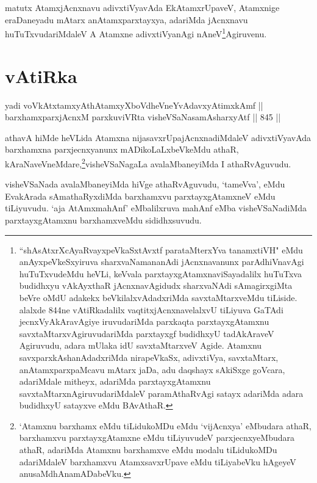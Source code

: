 \begin{artha}
matutx AtamxjAcnxnavu adivxtiVyavAda EkAtamxrUpaveV, Atamxnige eraDaneyadu mAtarx anAtamxparxtayxya, adariMda jAcnxnavu huTuTxvudariMdaleV A Atamxne adivxtiVyanAgi nAneV\footnote{``shAsAtxrXcAyaRvayxpeVkaSxtAvxtf parataMterxYva tanamxtiVH" eMdu anAyxpeVkeSxyiruva sharxvaNamananAdi jAcnxnavanunx parAdhiVnavAgi huTuTxvudeMdu heVLi, keVvala parxtayxgAtamxnaviSayadalilx huTuTxva budidhxyu vAkAyxthaR jAcnxnavAgidudx sharxvaNAdi sAmagirxgiMta beVre oMdU adakekx beVkilalxvAdadxriMda savxtaMtarxveMdu tiLiside. alalxde 844ne vAtiRkadalilx vaqtitxjAcnxnavelalxvU tiLiyuva GaTAdi jecnxVyAkAravAgiye iruvudariMda parxkaqta parxtayxgAtamxnu savxtaMtarxvAgiruvudariMda parxtayxgf budidhxyU tadAkAraveV Agiruvudu, adara mUlaka idU savxtaMtarxveV Agide. Atamxnu savxparxkAshanAdadxriMda nirapeVkaSx, adivxtiVya, savxtaMtarx, anAtamxparxpaMcavu mAtarx jaDa, adu daqshayx sAkiSxge goVcara, adariMdale mitheyx, adariMda parxtayxgAtamxnu savxtaMtarxnAgiruvudariMdaleV paramAthaRvAgi satayx adariMda adara budidhxyU satayxve eMdu BAvAthaR.}Agiruvenu.
\end{artha}

\section*{vAtiRka}


\begin{shl}
yadi voVkAtxtamxyAthAtamxyXboVdheVneYvAdavxyAtimxkAmf || \\
barxhamxparxjAcnxM parxkuviVRta visheVSaNasamAsharxyAtf \hfill || 845 ||  
\end{shl}

\begin{artha}
athavA hiMde heVLida Atamxna nijasavxrUpajAcnxnadiMdaleV adivxtiVyavAda barxhamxna parxjecnxyanunx mADikoLaLxbeVkeMdu athaR, kAraNaveVneMdare,\footnote{`Atamxnu barxhamx eMdu tiLidukoMDu eMdu `vijAcnxya' eMbudara athaR, barxhamxvu parxtayxgAtamxne eMdu tiLiyuvudeV parxjecnxyeMbudara athaR, adariMda Atamxnu barxhamxve eMdu modalu tiLidukoMDu adariMdaleV barxhamxvu AtamxsavxrUpave eMdu tiLiyabeVku hAgeyeV anusaMdhAnamADabeVku.}visheVSaNagaLa avalaMbaneyiMda I athaRvAguvudu.
\end{artha}

\begin{artha}
visheVSaNada avalaMbaneyiMda hiVge athaRvAguvudu, `tameVva', eMdu EvakArada sAmathaRyxdiMda barxhamxvu parxtayxgAtamxneV eMdu tiLiyuvudu. `aja AtAmxmahAnf' eMbalilxruva mahAnf eMba visheVSaNadiMda parxtayxgAtamxnu barxhamxveMdu sididhxsuvudu.
\end{artha}


